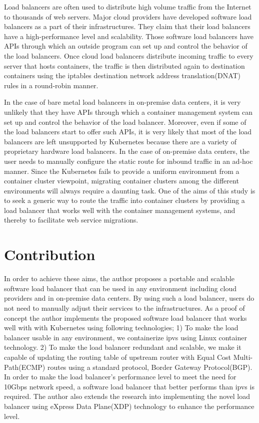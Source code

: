 Load balancers are often used to distribute high volume traffic from the Internet to thousands of web servers.
Major cloud providers have developed software load balancers\cite{eisenbud2016maglev,patel2013ananta} as a part of their infrastructures.
They claim that their load balancers have a high-performance level and scalability.
Those software load balancers have APIs through which an outside program can set up and control the behavior of the load balancers.
Once cloud load balancers distribute incoming traffic to every server that hosts containers,
the traffic is then distributed again to destination containers using the iptables destination network address translation(DNAT)\cite{MartinA.Brown2017,Marmol2015} rules in a round-robin manner.

In the case of bare metal load balancers in on-premise data centers, it is very unlikely that they have APIs through which a container management system can set up and control the behavior of the load balancer.
Moreover, even if some of the load balancers start to offer such APIs, it is very likely that most of the load balancers are left unsupported by Kubernetes  because there are a variety of proprietary hardware load balancers.
In the case of on-premise data centers, the user needs to manually configure the static route for inbound traffic in an ad-hoc manner.
Since the Kubernetes fails to provide a uniform environment from a container cluster viewpoint, migrating container clusters among the different environments will always require a daunting task.
One of the aims of this study is to seek a generic way to route the traffic into container clusters by providing a load balancer that works well with the container management systems, and thereby to facilitate web service migrations.

\section{Contribution}

In order to achieve these aims, the author proposes a portable and scalable software load balancer that can be used in any environment including cloud providers and in on-premise data centers.
By using such a load balancer, users do not need to manually adjust their services to the infrastructures.
As a proof of concept the author implements the proposed software load balancer that works well with with Kubernetes using following technologies;
1) To make the load balancer usable in any environment, we containerize ipvs\cite{Zhang2000} using Linux container technology\cite{menage2007adding}.
2) To make the load balancer redundant and scalable, we make it capable of updating the routing table of upstream router with Equal Cost Multi-Path(ECMP) routes\cite{al2008scalable} using a standard protocol, Border Gateway Protocol(BGP).
In order to make the load balancer's performance level to meet the need for 10Gbps network speed, a software load balancer that better performs than ipvs is required.
The author also extends the research into implementing the novel load balancer using eXpress Data Plane(XDP) technology\cite{bertin2017xdp} to enhance the performance level.

